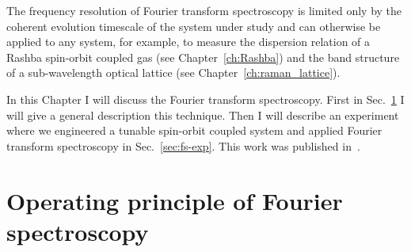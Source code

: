 The frequency resolution of Fourier transform spectroscopy is limited only by the coherent evolution timescale of the system under study and can otherwise be applied to any system, for example, to measure the dispersion relation of a Rashba spin-orbit coupled gas (see Chapter~\ref{ch:Rashba}) and the band structure of a sub-wavelength optical lattice (see Chapter~\ref{ch:raman_lattice}).

In this Chapter I will discuss the Fourier transform spectroscopy. First in Sec.~\ref{sec:fs-theory} I will give a general description this technique. Then I will describe an experiment where we engineered a tunable spin-orbit coupled system and applied Fourier transform spectroscopy in Sec.~\ref{sec:fs-exp}. This work was published in~\cite{valdes-curiel_fourier_2017}.

	 

\section{Operating principle of Fourier spectroscopy}
\label{sec:fs-theory}

